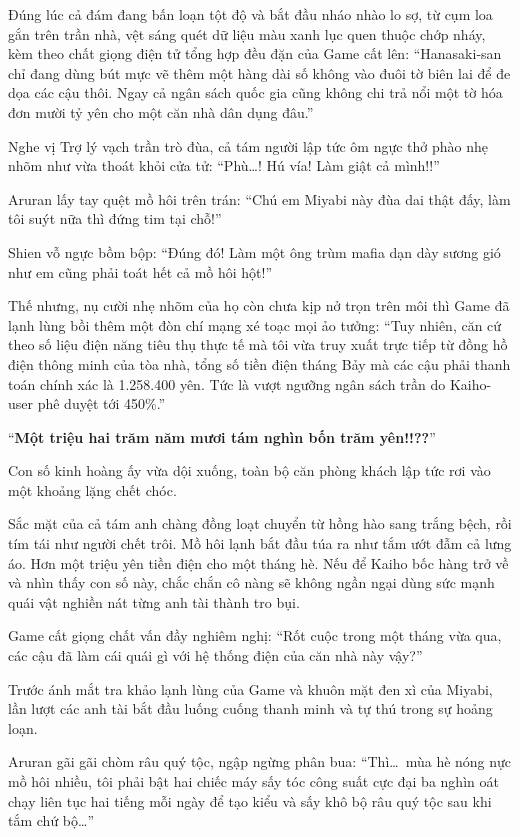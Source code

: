 \documentclass[../main.tex]{subfiles}
\begin{document}
Đúng lúc cả đám đang bấn loạn tột độ và bắt đầu nháo nhào lo sợ, từ cụm loa gắn trên trần nhà, vệt sáng quét dữ liệu màu xanh lục quen thuộc chớp nháy, kèm theo chất giọng điện tử tổng hợp đều đặn của Game cất lên: ``Hanasaki-san chỉ đang dùng bút mực vẽ thêm một hàng dài số không vào đuôi tờ biên lai để đe dọa các cậu thôi. Ngay cả ngân sách quốc gia cũng không chi trả nổi một tờ hóa đơn mười tỷ yên cho một căn nhà dân dụng đâu.''

Nghe vị Trợ lý vạch trần trò đùa, cả tám người lập tức ôm ngực thở phào nhẹ nhõm như vừa thoát khỏi cửa tử: ``Phù\dots! Hú vía! Làm giật cả mình!!''

Aruran lấy tay quệt mồ hôi trên trán: ``Chú em Miyabi này đùa dai thật đấy, làm tôi suýt nữa thì đứng tim tại chỗ!''

Shien vỗ ngực bồm bộp: ``Đúng đó! Làm một ông trùm mafia dạn dày sương gió như em cũng phải toát hết cả mồ hôi hột!''

Thế nhưng, nụ cười nhẹ nhõm của họ còn chưa kịp nở trọn trên môi thì Game đã lạnh lùng bồi thêm một đòn chí mạng xé toạc mọi ảo tưởng: ``Tuy nhiên, căn cứ theo số liệu điện năng tiêu thụ thực tế mà tôi vừa truy xuất trực tiếp từ đồng hồ điện thông minh của tòa nhà, tổng số tiền điện tháng Bảy mà các cậu phải thanh toán chính xác là 1.258.400 yên. Tức là vượt ngưỡng ngân sách trần do Kaiho-user phê duyệt tới 450\%.''

``\textbf{Một triệu hai trăm năm mươi tám nghìn bốn trăm yên!!??}''

Con số kinh hoàng ấy vừa dội xuống, toàn bộ căn phòng khách lập tức rơi vào một khoảng lặng chết chóc.

Sắc mặt của cả tám anh chàng đồng loạt chuyển từ hồng hào sang trắng bệch, rồi tím tái như người chết trôi. Mồ hôi lạnh bắt đầu túa ra như tắm ướt đẫm cả lưng áo. Hơn một triệu yên tiền điện cho một tháng hè. Nếu để Kaiho bốc hàng trở về và nhìn thấy con số này, chắc chắn cô nàng sẽ không ngần ngại dùng sức mạnh quái vật nghiền nát từng anh tài thành tro bụi.

Game cất giọng chất vấn đầy nghiêm nghị: ``Rốt cuộc trong một tháng vừa qua, các cậu đã làm cái quái gì với hệ thống điện của căn nhà này vậy?''

Trước ánh mắt tra khảo lạnh lùng của Game và khuôn mặt đen xì của Miyabi, lần lượt các anh tài bắt đầu luống cuống thanh minh và tự thú trong sự hoảng loạn.

Aruran gãi gãi chòm râu quý tộc, ngập ngừng phân bua: ``Thì\dots\ mùa hè nóng nực mồ hôi nhiều, tôi phải bật hai chiếc máy sấy tóc công suất cực đại ba nghìn oát chạy liên tục hai tiếng mỗi ngày để tạo kiểu và sấy khô bộ râu quý tộc sau khi tắm chứ bộ\dots''
\end{document}

